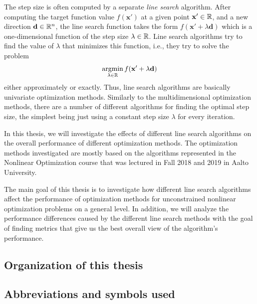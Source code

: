 \documentclass[a4paper,english,titlepage,12pt]{article}
\newcommand{\vect}[1]{\ensuremath{\mathbf{#1}}}
\newcommand{\R}{\ensuremath\mathbb{R}}
\begin{document}
The step size is often computed by a separate \emph{line search} algorithm. After computing the target function value $f(\vect{x}')$ at a given point $\vect{x}'\in \R$, and a new direction $\vect{d}\in \R^n$, the line search function takes the form $f(\vect{x}' + \lambda \vect{d})$ which is a one-dimensional function of the step size $\lambda\in \R$. Line search algorithms try to find the value of $\lambda$ that minimizes this function, i.e., they try to solve the problem
\begin{equation}\label{eq:ls}
\mathop{\text{argmin}}_{\lambda\in \R} f(\vect{x}' + \lambda \vect{d})
\end{equation}
either approximately or exactly. Thus, line search algorithms are basically univariate optimization methods. Similarly to the multidimensional optimization methods, there are a number of different algorithms for finding the optimal step size, the simplest being just using a constant step size $\lambda$ for every iteration. 

In this thesis, we will investigate the effects of different line search algorithms on the overall performance of different optimization methods. The optimization methods investigated are mostly based on the algorithms represented in the Nonlinear Optimization course that was lectured in Fall 2018 and 2019 in Aalto University.

The main goal of this thesis is to investigate how different line search algorithms affect the performance of optimization methods for unconstrained nonlinear optimization problems on a general level. In addition, we will analyze the performance differences caused by the different line search methods with the goal of finding metrics that give us the best overall view of the algorithm's performance.

\subsection{Organization of this thesis}

\subsection*{Abbreviations and symbols used}
\end{document}
